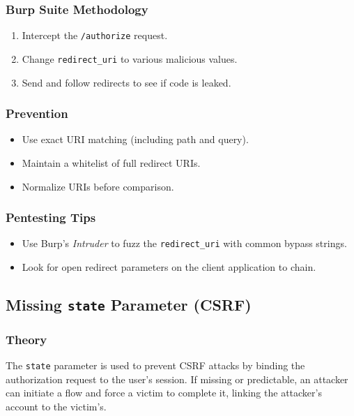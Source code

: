 \documentclass[12pt,a4paper]{article}
\begin{document}
\subsubsection{Burp Suite Methodology}
\begin{enumerate}
    \item Intercept the \texttt{/authorize} request.
    \item Change \texttt{redirect\_uri} to various malicious values.
    \item Send and follow redirects to see if code is leaked.
\end{enumerate}

\subsubsection{Prevention}
\begin{itemize}
    \item Use exact URI matching (including path and query).
    \item Maintain a whitelist of full redirect URIs.
    \item Normalize URIs before comparison.
\end{itemize}

\subsubsection{Pentesting Tips}
\begin{itemize}
    \item Use Burp's \textit{Intruder} to fuzz the \texttt{redirect\_uri} with common bypass strings.
    \item Look for open redirect parameters on the client application to chain.
\end{itemize}


\subsection{Missing \texttt{state} Parameter (CSRF)}
\subsubsection{Theory}
The \texttt{state} parameter is used to prevent CSRF attacks by binding the authorization request to the user's session. If missing or predictable, an attacker can initiate a flow and force a victim to complete it, linking the attacker's account to the victim's.
\end{document}
